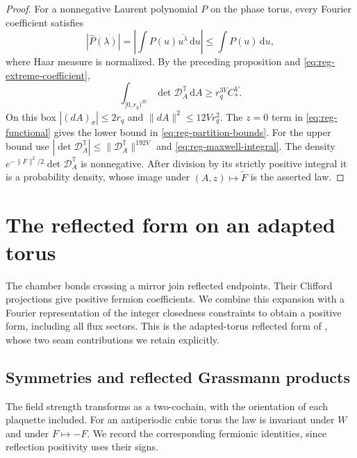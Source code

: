 \documentclass[11pt,letterpaper,reqno]{amsart}
\newcommand{\dd}{\mathrm d}
\begin{document}
\begin{proof}
For a nonnegative Laurent polynomial $P$ on the phase torus, every
Fourier coefficient satisfies
\[
 |\widehat P(\lambda)|
 =\left|\int P(u)\overline{u^\lambda}\,\dd u\right|
 \le\int P(u)\,\dd u,
\]
where Haar measure is normalized. By the preceding proposition and
\eqref{eq:reg-extreme-coefficient},
\[
 \int_{[0,r_q)^{3V}}\det \mathcal D_A^{\mathbb T}\,\dd A
 \ge r_q^{3V}C_*^V.
\]
On this box $|(dA)_\sigma|\le2r_q$ and
$\|dA\|^2\le12Vr_q^2$. The $z=0$ term in
\eqref{eq:reg-functional} gives the lower bound in
\eqref{eq:reg-partition-bounds}. For the upper bound use
$|\det \mathcal D_A^{\mathbb T}|\le\|\mathcal D_A^{\mathbb T}\|^{192V}$ and
\eqref{eq:reg-maxwell-integral}. The density
$e^{-\|F\|^2/2}\det \mathcal D_A^{\mathbb T}$ is nonnegative. After division
by its strictly positive integral it is a probability density, whose
image under $(A,z)\mapsto\widetilde F$ is the asserted law.
\end{proof}

\section{The reflected form on an adapted torus}\label{sec:finite-reflection}

The chamber bonds crossing a mirror join reflected endpoints. Their
Clifford projections give positive fermion coefficients. We combine
this expansion with a Fourier representation of the integer closedness
constraints to obtain a positive form, including all flux sectors.
This is the adapted-torus reflected form of
\cite[Sections~3.6--3.7]{ChamberQED}, whose two seam contributions
we retain explicitly.

\subsection{Symmetries and reflected Grassmann products}
\label{subsec:reg-symmetries}

The field strength transforms as a two-cochain, with the orientation
of each plaquette included. For an antiperiodic cubic torus the law is invariant
under $W$ and under $F\mapsto-F$. We record the corresponding
fermionic identities, since reflection positivity uses their signs.
\end{document}
